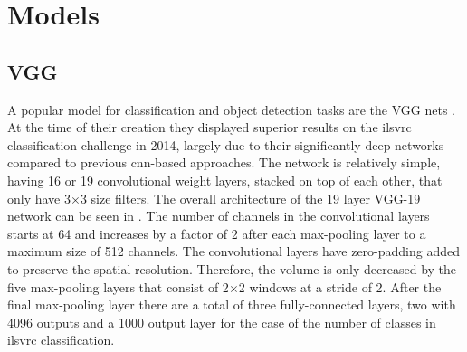 \section{Models}

\subsection{VGG}
A popular model for classification and object detection tasks are the VGG nets \cite{vgg16}. At the time of their creation they displayed superior results on the \gls{ilsvrc} classification challenge in 2014, largely due to their significantly deep networks compared to previous \gls{cnn}-based approaches. The network is relatively simple, having 16 or 19 convolutional weight layers, stacked on top of each other, that only have 3$\times$3 size filters. The overall architecture of the 19 layer VGG-19 network can be seen in . The number of channels in the convolutional layers starts at 64 and increases by a factor of 2 after each max-pooling layer to a maximum size of 512 channels. The convolutional layers have zero-padding added to preserve the spatial resolution. Therefore, the volume is only decreased by the five max-pooling layers that consist of 2$\times$2 windows at a stride of 2. After the final max-pooling layer there are a total of three fully-connected layers, two with 4096 outputs and a 1000 output layer for the case of the number of classes in \gls{ilsvrc} classification.

